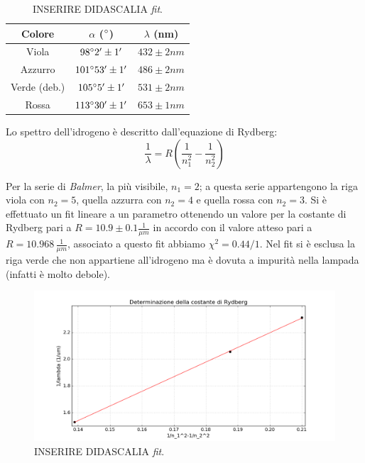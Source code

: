 \documentclass[10pt,a4paper]{article}
\begin{document}
\begin{table}[!htb]
\begin{table}[!htb]
\centering
\begin{tabular}{|c|c|c|}
\hline
Colore & $\alpha$ ($\degree$) & $\lambda$ (nm)\\
\hline 
Viola & $98 \degree 2' \pm 1'$ & $432 \pm 2 nm$ \\ 
\hline 
Azzurro & $101 \degree 53' \pm 1'$ & $486 \pm 2 nm$ \\ 
\hline 
Verde (deb.)& $105 \degree 5' \pm 1'$ & $531 \pm 2 nm$ \\ 
\hline 
Rossa & $113 \degree 30' \pm 1'$ & $653 \pm 1 nm$ \\ 
\hline 
\end{tabular} 
\caption{Dati misurati per la lampada a idrogeno.}\label{idrogeno}
\end{table}

Lo spettro dell'idrogeno è descritto dall'equazione di Rydberg:
\begin{equation}
\frac{1}{\lambda}=R \left( \frac{1}{n_{1}^2}-\frac{1}{n_{2}^2} \right)
\end{equation}

Per la serie di \emph{Balmer}, la più visibile, $n_1=2$; a questa serie appartengono la riga viola con $n_2=5$, quella azzurra con $n_2=4$ e quella rossa con $n_2=3$. Si è effettuato un fit lineare a un parametro ottenendo un valore per la costante di Rydberg pari a $R = 10.9 \pm 0.1 \frac{1}{\mu m}$ in accordo con il valore atteso pari a $R=10.968\, \frac{1}{\mu m}$, associato a questo fit abbiamo $\chi^2 = 0.44/1$. Nel fit si è esclusa la riga verde che non appartiene all'idrogeno ma è dovuta a impurità nella lampada (infatti è molto debole).\\

\begin{figure}[!htb]
  \centering
  \includegraphics[scale=0.6]{ryd.png}
\caption{INSERIRE DIDASCALIA \emph{fit}.}
\label{pin}
\end{figure}



\end{table}
\end{document}
